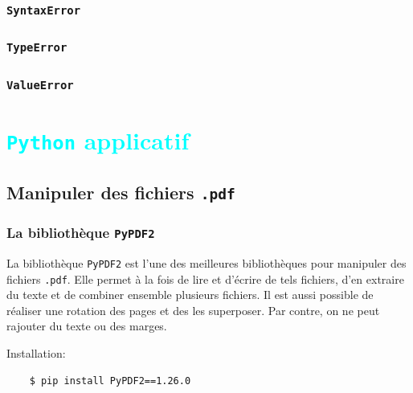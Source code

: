 \documentclass[a4paper,11pt]{book}
\begin{document}
\section{\texttt{SyntaxError}}
\section{\texttt{TypeError}}
\section{\texttt{ValueError}}
\medskip

\part{\textcolor{cyan}{\texttt{Python} applicatif}}
\chapter{Manipuler des fichiers \texttt{.pdf}}
\section{La bibliothèque \texttt{PyPDF2}}
La bibliothèque \texttt{PyPDF2} est l'une des meilleures bibliothèques pour manipuler des fichiers \texttt{.pdf}. Elle permet à la fois de lire et d'écrire de tels fichiers, d'en extraire du texte et de combiner ensemble plusieurs fichiers. Il est aussi possible de réaliser une rotation des pages et des les superposer. Par contre, on ne peut rajouter du texte ou des marges.
\medskip

Installation:
\begin{verbatim}
    $ pip install PyPDF2==1.26.0
\end{verbatim}
\medskip
\end{document}
